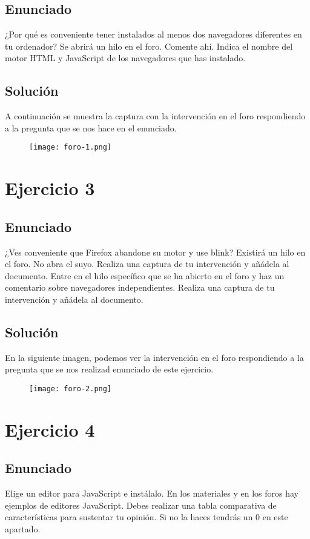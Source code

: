 \subsection{Enunciado}
¿Por qué es conveniente tener instalados al menos dos navegadores diferentes en tu ordenador? Se abrirá un hilo en el foro. Comente ahí.   Indica el nombre del motor HTML y JavaScript de los navegadores que has instalado.

\subsection{Solución}
A continuación se muestra la captura con la intervención en el foro respondiendo a la pregunta que se nos hace en el enunciado.

\begin{figure}[H]
    \centering
    \texttt{[image: foro-1.png]}
\end{figure}

\section{Ejercicio 3}
\subsection{Enunciado}
¿Ves conveniente que  Firefox abandone su motor y use blink?  Existirá un hilo en el foro. No abra el suyo. Realiza una captura de tu intervención y añádela al documento.  Entre en el hilo específico que se ha abierto en el foro  y haz un comentario sobre navegadores independientes. Realiza una captura de tu intervención y añádela al documento.

\subsection{Solución}
En la siguiente imagen, podemos ver la intervención en el foro respondiendo a la pregunta que se nos realizad enunciado de este ejercicio.

\begin{figure}[H]
    \centering
    \texttt{[image: foro-2.png]}
\end{figure}

\section{Ejercicio 4}
\subsection{Enunciado}
Elige un editor para JavaScript e instálalo.  En los materiales y en los foros hay ejemplos de  editores JavaScript. Debes realizar una tabla comparativa de características para sustentar tu opinión. Si no la haces tendrás un 0 en este apartado.


